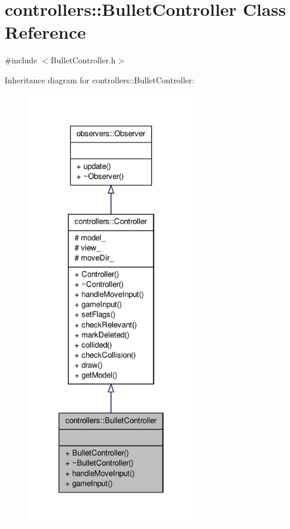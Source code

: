 \hypertarget{classcontrollers_1_1BulletController}{\section{controllers\-:\-:\-Bullet\-Controller \-Class \-Reference}
\label{da/d3c/classcontrollers_1_1BulletController}
}


{\ttfamily \#include $<$\-Bullet\-Controller.\-h$>$}



\-Inheritance diagram for controllers\-:\-:\-Bullet\-Controller\-:
\nopagebreak
\begin{figure}[H]
\begin{center}
\leavevmode
\includegraphics[height=550pt]{da/d28/classcontrollers_1_1BulletController__inherit__graph}
\end{center}
\end{figure}


